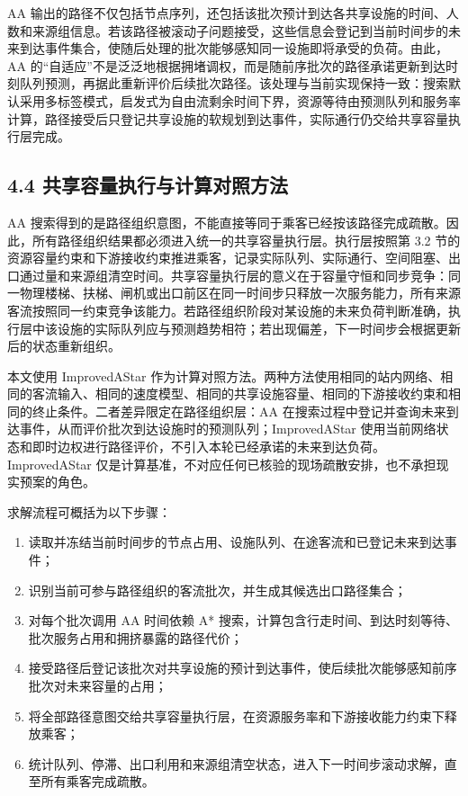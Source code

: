\documentclass[UTF8,a4paper,12pt]{ctexart}
\begin{document}
AA 输出的路径不仅包括节点序列，还包括该批次预计到达各共享设施的时间、人数和来源组信息。若该路径被滚动子问题接受，这些信息会登记到当前时间步的未来到达事件集合，使随后处理的批次能够感知同一设施即将承受的负荷。由此，AA 的“自适应”不是泛泛地根据拥堵调权，而是随前序批次的路径承诺更新到达时刻队列预测，再据此重新评价后续批次路径。该处理与当前实现保持一致：搜索默认采用多标签模式，启发式为自由流剩余时间下界，资源等待由预测队列和服务率计算，路径接受后只登记共享设施的软规划到达事件，实际通行仍交给共享容量执行层完成。

\subsection{4.4 共享容量执行与计算对照方法}

AA 搜索得到的是路径组织意图，不能直接等同于乘客已经按该路径完成疏散。因此，所有路径组织结果都必须进入统一的共享容量执行层。执行层按照第 3.2 节的资源容量约束和下游接收约束推进乘客，记录实际队列、实际通行、空间阻塞、出口通过量和来源组清空时间。共享容量执行层的意义在于容量守恒和同步竞争：同一物理楼梯、扶梯、闸机或出口前区在同一时间步只释放一次服务能力，所有来源客流按照同一约束竞争该能力。若路径组织阶段对某设施的未来负荷判断准确，执行层中该设施的实际队列应与预测趋势相符；若出现偏差，下一时间步会根据更新后的状态重新组织。

本文使用 ImprovedAStar 作为计算对照方法。两种方法使用相同的站内网络、相同的客流输入、相同的速度模型、相同的共享设施容量、相同的下游接收约束和相同的终止条件。二者差异限定在路径组织层：AA 在搜索过程中登记并查询未来到达事件，从而评价批次到达设施时的预测队列；ImprovedAStar 使用当前网络状态和即时边权进行路径评价，不引入本轮已经承诺的未来到达负荷。ImprovedAStar 仅是计算基准，不对应任何已核验的现场疏散安排，也不承担现实预案的角色。

求解流程可概括为以下步骤：
\begin{enumerate}
\item 读取并冻结当前时间步的节点占用、设施队列、在途客流和已登记未来到达事件；
\item 识别当前可参与路径组织的客流批次，并生成其候选出口路径集合；
\item 对每个批次调用 AA 时间依赖 A* 搜索，计算包含行走时间、到达时刻等待、批次服务占用和拥挤暴露的路径代价；
\item 接受路径后登记该批次对共享设施的预计到达事件，使后续批次能够感知前序批次对未来容量的占用；
\item 将全部路径意图交给共享容量执行层，在资源服务率和下游接收能力约束下释放乘客；
\item 统计队列、停滞、出口利用和来源组清空状态，进入下一时间步滚动求解，直至所有乘客完成疏散。
\end{enumerate}
\end{document}
